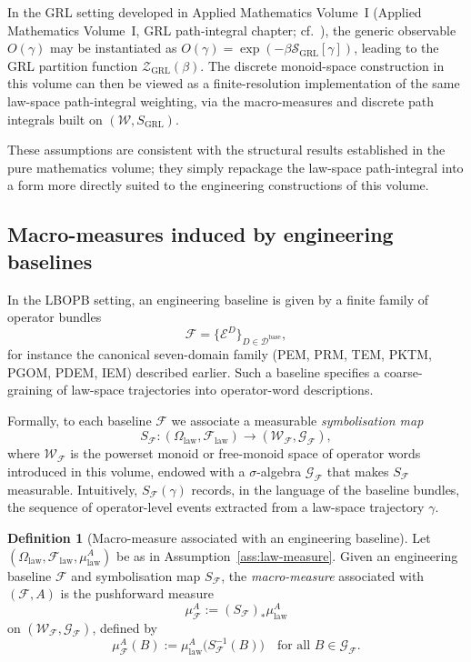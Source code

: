 \documentclass[11pt]{book}
\theoremstyle{plain}
\theoremstyle{definition}
\newtheorem{definition}[theorem]{Definition}
\theoremstyle{remark}
\begin{document}
In the GRL setting developed in Applied Mathematics Volume~I
(Applied Mathematics Volume~I, GRL path-integral chapter; cf.\ \cite{GaoZhengAppVol1}), the generic observable
$O(\gamma)$ may be instantiated as
$O(\gamma) = \exp(-\beta \mathcal{S}_{\mathrm{GRL}}[\gamma])$, leading
to the GRL partition function $\mathcal{Z}_{\mathrm{GRL}}(\beta)$.
The discrete monoid-space construction in this volume can then be
viewed as a finite-resolution implementation of the same law-space
path-integral weighting, via the macro-measures and discrete path
integrals built on $(\mathcal{W},S_{\mathrm{GRL}})$.

These assumptions are consistent with the structural results established
in the pure mathematics volume; they simply repackage the law-space
path-integral into a form more directly suited to the engineering
constructions of this volume.

\subsection{Macro-measures induced by engineering baselines}

In the LBOPB setting, an engineering baseline is given by a finite
family of operator bundles
\[
  \mathcal{F}
  =
  \{\mathcal{E}^D\}_{D\in\mathcal{D}^{\mathrm{base}}},
\]
for instance the canonical seven-domain family
(PEM, PRM, TEM, PKTM, PGOM, PDEM, IEM) described earlier.
Such a baseline specifies a coarse-graining of law-space trajectories
into operator-word descriptions.

Formally, to each baseline $\mathcal{F}$ we associate a measurable
\emph{symbolisation map}
\[
  S_{\mathcal{F}} :
  (\Omega_{\mathrm{law}}, \mathcal{F}_{\mathrm{law}})
  \longrightarrow
  (\mathcal{W}_{\mathcal{F}}, \mathcal{G}_{\mathcal{F}}),
\]
where $\mathcal{W}_{\mathcal{F}}$ is the powerset monoid or free-monoid
space of operator words introduced in this volume, endowed with a
$\sigma$-algebra $\mathcal{G}_{\mathcal{F}}$ that makes
$S_{\mathcal{F}}$ measurable.
Intuitively, $S_{\mathcal{F}}(\gamma)$ records, in the language of the
baseline bundles, the sequence of operator-level events extracted from
a law-space trajectory $\gamma$.

\begin{definition}[Macro-measure associated with an engineering baseline]
Let $(\Omega_{\mathrm{law}}, \mathcal{F}_{\mathrm{law}}, \mu_{\mathrm{law}}^A)$
be as in Assumption~\ref{ass:law-measure}.
Given an engineering baseline $\mathcal{F}$ and symbolisation map
$S_{\mathcal{F}}$, the \emph{macro-measure} associated with $(\mathcal{F},A)$
is the pushforward measure
\[
  \mu_{\mathcal{F}}^A := (S_{\mathcal{F}})_* \mu_{\mathrm{law}}^A
\]
on $(\mathcal{W}_{\mathcal{F}}, \mathcal{G}_{\mathcal{F}})$, defined by
\[
  \mu_{\mathcal{F}}^A(B)
  := \mu_{\mathrm{law}}^A\bigl(S_{\mathcal{F}}^{-1}(B)\bigr)
  \quad\text{for all } B\in\mathcal{G}_{\mathcal{F}}.
\]
\end{definition}
\end{document}
